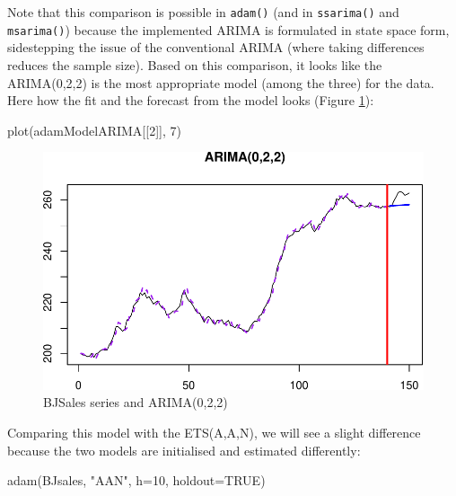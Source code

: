 \documentclass[
]{book}
\newenvironment{Shaded}{\begin{snugshade}}{\end{snugshade}}
\newcommand{\AttributeTok}[1]{\textcolor[rgb]{0.77,0.63,0.00}{#1}}
\newcommand{\ConstantTok}[1]{\textcolor[rgb]{0.00,0.00,0.00}{#1}}
\newcommand{\DecValTok}[1]{\textcolor[rgb]{0.00,0.00,0.81}{#1}}
\newcommand{\FunctionTok}[1]{\textcolor[rgb]{0.00,0.00,0.00}{#1}}
\newcommand{\NormalTok}[1]{#1}
\newcommand{\StringTok}[1]{\textcolor[rgb]{0.31,0.60,0.02}{#1}}
\theoremstyle{definition}
\theoremstyle{definition}
\theoremstyle{definition}
\theoremstyle{definition}
\theoremstyle{remark}
\begin{document}
Note that this comparison is possible in \texttt{adam()} (and in \texttt{ssarima()} and \texttt{msarima()}) because the implemented ARIMA is formulated in state space form, sidestepping the issue of the conventional ARIMA (where taking differences reduces the sample size). Based on this comparison, it looks like the ARIMA(0,2,2) is the most appropriate model (among the three) for the data. Here how the fit and the forecast from the model looks (Figure \ref{fig:adamARIMAPlotBJSales}):

\begin{Shaded}
\begin{Highlighting}[]
\FunctionTok{plot}\NormalTok{(adamModelARIMA[[}\DecValTok{2}\NormalTok{]], }\DecValTok{7}\NormalTok{)}
\end{Highlighting}
\end{Shaded}

\begin{figure}
\centering
\includegraphics{Svetunkov--2022----ADAM_files/figure-latex/adamARIMAPlotBJSales-1.pdf}
\caption{\label{fig:adamARIMAPlotBJSales}BJSales series and ARIMA(0,2,2)}
\end{figure}

Comparing this model with the ETS(A,A,N), we will see a slight difference because the two models are initialised and estimated differently:

\begin{Shaded}
\begin{Highlighting}[]
\FunctionTok{adam}\NormalTok{(BJsales, }\StringTok{"AAN"}\NormalTok{, }\AttributeTok{h=}\DecValTok{10}\NormalTok{, }\AttributeTok{holdout=}\ConstantTok{TRUE}\NormalTok{)}
\end{Highlighting}
\end{Shaded}
\end{document}
